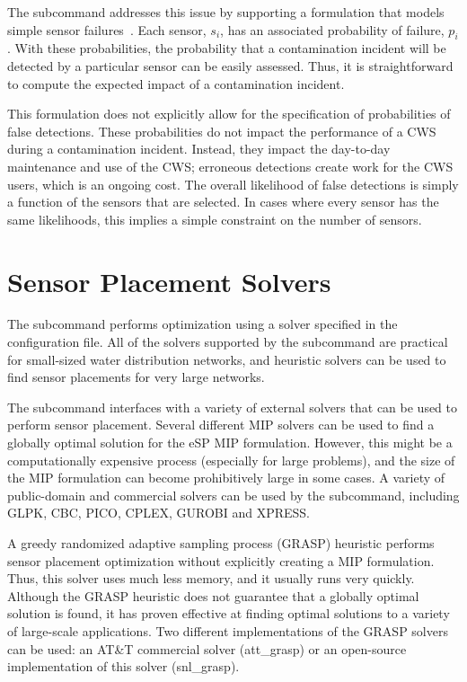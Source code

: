 The  subcommand addresses this issue by supporting a formulation that models simple sensor 
failures~\cite{BerryCHLPW09}. Each sensor, $s_i$, has an associated probability
of failure, $p_i$. With these probabilities, the probability 
that a contamination incident will be detected by a particular sensor can be easily assessed. Thus, it 
is straightforward to compute the expected impact of a contamination incident.

This formulation does not explicitly allow for the specification of probabilities 
of false detections. These probabilities do not impact the performance of a CWS 
during a contamination incident. Instead, they impact the day-\/to-\/day maintenance
and use of the CWS; erroneous detections create work for the CWS users, which is an 
ongoing cost. The overall likelihood of false detections is simply a function of the
sensors that are selected. In cases where every sensor has the same likelihoods, this 
implies a simple constraint on the number of sensors. 
\fi

\section{Sensor Placement Solvers}

The  subcommand performs optimization using a solver specified in the
configuration file. All of the solvers supported by the  subcommand are practical
for small-\/sized water distribution networks, and heuristic
solvers can be used to find sensor placements for very large networks.

The  subcommand interfaces with a variety of external
solvers that can be used to perform sensor placement. Several
different MIP solvers can be used to find a globally optimal solution
for the eSP MIP formulation. However, this might be a computationally
expensive process (especially for large problems), and the size of
the MIP formulation can become prohibitively large in some cases. 
A variety of public-domain and commercial solvers can be used by
the  subcommand, including GLPK, CBC, PICO, CPLEX, GUROBI and
XPRESS.


A greedy randomized adaptive sampling process (GRASP) heuristic 
performs sensor placement optimization without
explicitly creating a MIP formulation. Thus, this solver uses much
less memory, and it usually runs very quickly. Although the GRASP
heuristic does not guarantee that a globally optimal solution is
found, it has proven effective at finding optimal solutions to a
variety of large-scale applications. Two different implementations
of the GRASP solvers can be used: an AT\&T commercial solver (att\_grasp)
or an open-source implementation of this solver (snl\_grasp).

